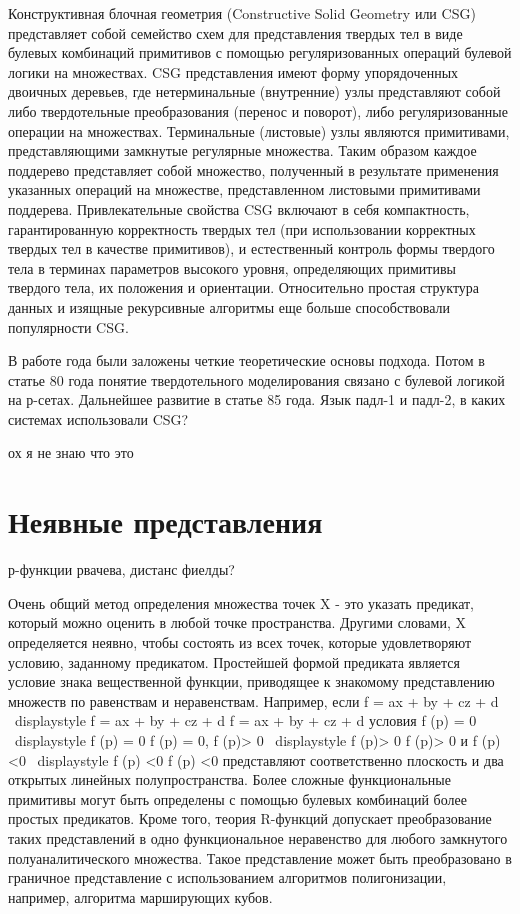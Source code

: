 Конструктивная блочная геометрия (Constructive Solid Geometry или CSG) представляет собой семейство схем для представления твердых тел в виде булевых комбинаций примитивов с помощью регуляризованных операций булевой логики на множествах. CSG представления имеют форму упорядоченных двоичных деревьев, где нетерминальные (внутренние) узлы представляют собой либо твердотельные преобразования (перенос и поворот), либо регуляризованные операции на множествах. Терминальные (листовые) узлы являются примитивами, представляющими замкнутые регулярные множества. Таким образом каждое поддерево представляет собой множество, полученный в результате применения указанных операций на множестве, представленном листовыми примитивами поддерева. Привлекательные свойства CSG включают в себя компактность, гарантированную корректность твердых тел (при использовании корректных твердых тел в качестве примитивов), и естественный контроль формы твердого тела в терминах параметров высокого уровня, определяющих примитивы твердого тела, их положения и ориентации. Относительно простая структура данных и изящные рекурсивные алгоритмы еще больше способствовали популярности CSG.

В работе \cite{Requicha 77} года были заложены четкие теоретические основы подхода. Потом в статье 80 года понятие твердотельного моделирования связано с булевой логикой на р-сетах. Дальнейшее развитие в статье 85 года. Язык падл-1 и падл-2, в каких системах использовали CSG?

ох я не знаю что это
\cite{Computable Operators on Regular Sets}

\section{Неявные представления} \label{sect_implicit}

р-функции рвачева, дистанс фиелды?

Очень общий метод определения множества точек X - это указать предикат, который можно оценить в любой точке пространства. Другими словами, X определяется неявно, чтобы состоять из всех точек, которые удовлетворяют условию, заданному предикатом. Простейшей формой предиката является условие знака вещественной функции, приводящее к знакомому представлению множеств по равенствам и неравенствам. Например, если f = ax + by + cz + d {\ displaystyle f = ax + by + cz + d} f = ax + by + cz + d условия f (p) = 0 {\ displaystyle f (p) = 0} f (p) = 0, f (p)> 0 {\ displaystyle f (p)> 0} f (p)> 0 и f (p) <0 {\ displaystyle f (p) <0} f (p) <0 представляют соответственно плоскость и два открытых линейных полупространства. Более сложные функциональные примитивы могут быть определены с помощью булевых комбинаций более простых предикатов. Кроме того, теория R-функций допускает преобразование таких представлений в одно функциональное неравенство для любого замкнутого полуаналитического множества. Такое представление может быть преобразовано в граничное представление с использованием алгоритмов полигонизации, например, алгоритма марширующих кубов.

